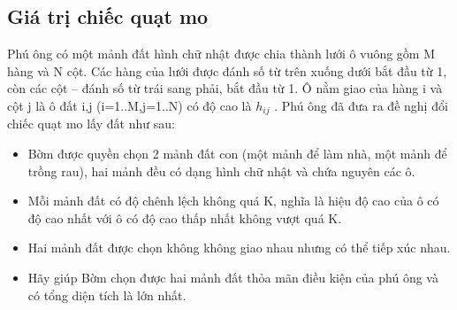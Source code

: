 \subsection{   Giá trị chiếc quạt mo  }

   Phú ông có một mảnh đất hình chữ nhật được chia thành lưới ô vuông gồm M hàng và N cột. Các hàng của lưới được đánh số từ trên xuống dưới bắt đầu từ 1, còn các cột – đánh số từ trái sang phải, bắt đầu từ 1. Ô nằm giao của hàng i và cột j là ô đất i,j (i=1..M,j=1..N) có độ cao là $h_{ij}$   . Phú ông đã đưa ra đề nghị đổi chiếc quạt mo lấy đất như sau:  
\begin{itemize}
	\item     Bờm được quyền chọn 2 mảnh đất con (một mảnh để làm nhà, một mảnh để trồng rau), hai mảnh đều có dạng hình chữ nhật và chứa nguyên các ô.   
	\item     Mỗi mảnh đất có độ chênh lệch không quá K, nghĩa là hiệu độ cao của ô có độ cao nhất với ô có độ cao thấp nhất không vượt quá K.   
	\item     Hai mảnh đất được chọn không không giao nhau nhưng có thể tiếp xúc nhau.   
	\item     Hãy giúp Bờm chọn được hai mảnh đất thỏa mãn điều kiện của phú ông và có tổng diện tích là lớn nhất.   
\end{itemize}